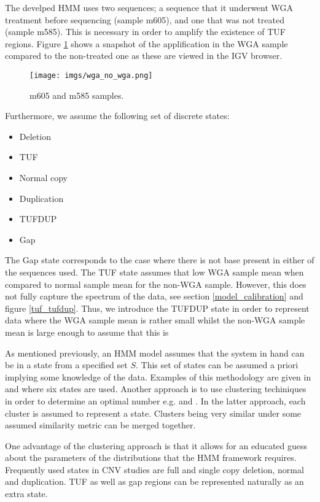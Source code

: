The develped HMM uses two sequences; a sequence that it underwent WGA treatment before sequencing (sample  m605), and  one that was not treated (sample m585). 
This is necessary in order to amplify the existence of TUF regions.  Figure \ref{wga_no_wga } shows a snapshot of the applification in the WGA sample compared to the non-treated one as these are viewed in the IGV browser.


\begin{figure}[!htb]
	\begin{center}
		\texttt{[image: imgs/wga\_no\_wga.png]}
	\end{center}
	\caption{m605 and m585 samples.}
	\label{wga_no_wga }
\end{figure}

Furthermore, we assume the following set of discrete states:

\begin{itemize}
	\item Deletion
	\item TUF
	\item Normal copy
	\item Duplication
	\item TUFDUP
	\item Gap
\end{itemize}

The Gap state  corresponds to the case where there is not base present in either of the sequences used. The TUF state assumes that low WGA sample mean when compared to normal sample mean for the non-WGA sample. However, this does not fully capture the spectrum of the data, see section \ref{model_calibration} and figure \ref{tuf_tufdup}.  Thus, we introduce the  TUFDUP state in order to represent data where the WGA sample mean is rather small whilst the non-WGA sample mean is large enough to assume that this is

As mentioned previously, an HMM model assumes that the system in hand can be in a state from a specified set $S$. This set of states can be assumed a priori implying some knowledge of the data. Examples of this methodology are given in \cite{coella2007} and \cite{Wang2007}  where six states are used. 
Another approach is to use clustering techiniques in order to determine an optimal number e.g. \cite{fridlyand2004} and \cite{liu2017}. In the latter approach, each cluster is assumed to represent a state. Clusters being very similar under some assumed similarity metric can be merged together.  

One advantage of the clustering approach is that it allows for an educated guess about the parameters of the distributions that the HMM framework requires. Frequently used states in CNV studies are full and single copy deletion, normal and duplication. TUF as well as gap regions can be represented naturally as an extra state. 


